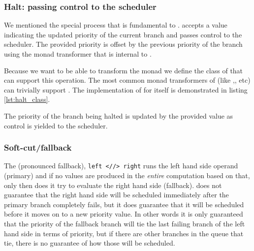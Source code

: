 \subsubsection{Halt: passing control to the scheduler}

We mentioned the special  process that is fundamental to .
 accepts a value indicating the updated
priority of the current branch and passes control to the scheduler. The provided priority is offset by the previous
priority of the branch using the  monad transformer that is internal to .

Because we want to be able to transform the  monad we define the class of
 that can support this operation. The most common monad
transformers of  (like ,, etc)
can trivially support . The implementation of 
for  itself is demonstrated in listing
\ref{lst:halt_class}. 

\begin{code}
  \caption{\label{lst:halt_class}The
    priority of the branch being halted is updated
    by the provided value as control is yielded to the scheduler.}
\end{code}


\subsubsection{Soft-cut/fallback}

The \hask{<//>} (pronounced fallback), \texttt{left <//> right} runs
the left hand side operand (primary) and if no values are produced in
the \emph{entire} computation based on that, only then does it try to
evaluate the right hand side (fallback).  does not
guarantee that the right hand side will be scheduled immediately after
the primary branch completely fails, but it does guarantee that it
will be scheduled before it moves on to a new priority value. In other
words it is only guaranteed that the priority of the fallback branch
will tie the last failing branch of the left hand side in terms of
priority, but if there are other branches in the queue that tie, there
is no guarantee of how those will be scheduled.

